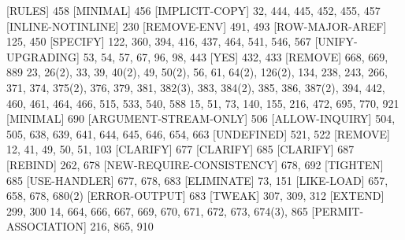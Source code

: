[RULES] {\footnotesize 458}
[MINIMAL] {\footnotesize 456}
[IMPLICIT-COPY] {\footnotesize 32, 444, 445, 452, 455, 457}
[INLINE-NOTINLINE] {\footnotesize 230}
[REMOVE-ENV] {\footnotesize 491, 493}
[ROW-MAJOR-AREF] {\footnotesize 125, 450}
[SPECIFY] {\footnotesize 122, 360, 394, 416, 437, 464, 541, 546, 567}
[UNIFY-UPGRADING] {\footnotesize 53, 54, 57, 67, 96, 98, 443}
[YES] {\footnotesize 432, 433}
[REMOVE] {\footnotesize 668, 669, 889}
 {\footnotesize 23, 26(2), 33, 39, 40(2), 49, 50(2), 56, 61, 64(2), 126(2), 
                               134, 238, 243, 266, 371, 374, 375(2), 376, 379, 381, 382(3), 
                               383, 384(2), 385, 386, 387(2), 394, 442, 460, 461, 464, 466, 515,
                               533, 540, 588}
 {\footnotesize 15, 51, 73, 140, 155, 216, 472, 695, 770, 921}
[MINIMAL] {\footnotesize 690}
[ARGUMENT-STREAM-ONLY] {\footnotesize 506}
[ALLOW-INQUIRY] {\footnotesize 504, 505, 638, 639, 641, 644, 645, 646, 654, 663}
[UNDEFINED] {\footnotesize 521, 522}
[REMOVE] {\footnotesize 12, 41, 49, 50, 51, 103}
[CLARIFY] {\footnotesize 677}
[CLARIFY] {\footnotesize 685}
[CLARIFY] {\footnotesize 687}
[REBIND] {\footnotesize 262, 678}
[NEW-REQUIRE-CONSISTENCY] {\footnotesize 678, 692}
[TIGHTEN] {\footnotesize 685}
[USE-HANDLER] {\footnotesize 677, 678, 683}
[ELIMINATE] {\footnotesize 73, 151}
[LIKE-LOAD] {\footnotesize 657, 658, 678, 680(2)}
[ERROR-OUTPUT] {\footnotesize 683}
[TWEAK] {\footnotesize 307, 309, 312}
[EXTEND] {\footnotesize 299, 300}
 {\footnotesize 14, 664, 666, 667, 669, 670, 671, 672, 673, 674(3), 865}
[PERMIT-ASSOCIATION] {\footnotesize 216, 865, 910}
